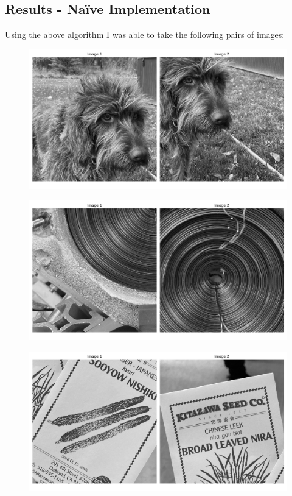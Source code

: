 \documentclass[]{article}
\begin{document}
\newpage
\subsection{Results - Na\"ive Implementation}
Using the above algorithm I was able to take the following pairs of images:
\begin{figure}[H]
	\centering
	\includegraphics[width=6.5in]{p3_output/img_0_pieces.png}
\end{figure}

\begin{figure}[H]
	\centering
	\includegraphics[width=6.5in]{p3_output/img_1_pieces.png}
\end{figure}

\begin{figure}[H]
	\centering
	\includegraphics[width=6.5in]{p3_output/img_3_pieces.png}
\end{figure}
\end{document}
